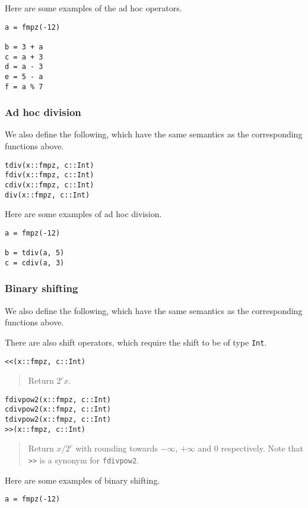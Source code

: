 \documentclass[a4paper,10pt]{article}
\newcommand{\code}{\lstinline}
\newcommand{\desc}[1]{\vspace{-3mm}\begin{quote}#1\end{quote}}
\begin{document}
{{Here are some examples of the ad hoc operators.

\begin{lstlisting}
a = fmpz(-12)

b = 3 + a
c = a + 3
d = a - 3
e = 5 - a
f = a % 7
\end{lstlisting}

\subsubsection{Ad hoc division}

We also define the following, which have the same semantics as the corresponding functions above.

\begin{lstlisting}
tdiv(x::fmpz, c::Int)
fdiv(x::fmpz, c::Int)
cdiv(x::fmpz, c::Int)
div(x::fmpz, c::Int)
\end{lstlisting}

Here are some examples of ad hoc division.

\begin{lstlisting}
a = fmpz(-12)

b = tdiv(a, 5)
c = cdiv(a, 3)
\end{lstlisting}

\subsubsection{Binary shifting}

We also define the following, which have the same semantics as the corresponding functions above.

There are also shift operators, which require the shift to be of type \code{Int}.

\begin{lstlisting}
<<(x::fmpz, c::Int)
\end{lstlisting}

\desc{Return $2^c x$.}

\begin{lstlisting}
fdivpow2(x::fmpz, c::Int)
cdivpow2(x::fmpz, c::Int)
tdivpow2(x::fmpz, c::Int)
>>(x::fmpz, c::Int)
\end{lstlisting}

\desc{Return $x/2^c$ with rounding towards $-\infty$, $+\infty$ and $0$ respectively. 
Note that \code{>>} is a synonym for \code{fdivpow2}.}

Here are some examples of binary shifting.

\begin{lstlisting}
a = fmpz(-12)


\end{lstlisting}}}
\end{document}
